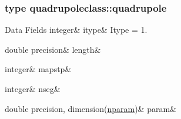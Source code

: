 \subsubsection{type quadrupoleclass\+::quadrupole}
\begin{DoxyFields}{Data Fields}
\mbox{\label{namespacequadrupoleclass_addaf50b0cff1aec9fc452925c7819bdb}} 
integer&
itype&
Itype = 1. \\
\hline

\mbox{\label{namespacequadrupoleclass_ac84e0debf991be5cd71ee964781dd7af}} 
double precision&
length&
\\
\hline

\mbox{\label{namespacequadrupoleclass_a283a967adb1fb9dd7c742b5ce97ef3a0}} 
integer&
mapstp&
\\
\hline

\mbox{\label{namespacequadrupoleclass_afece7d333f73554720932318f413f11b}} 
integer&
nseg&
\\
\hline

\mbox{\label{namespacequadrupoleclass_ab9bcd11b6a6e1b6d7242eb243029393f}} 
double precision, dimension(\mbox{\hyperlink{namespacequadrupoleclass_a8eba81bd9796e431c21d0f46260b0c6c}{nparam}})&
param&
\\
\hline

\end{DoxyFields}
